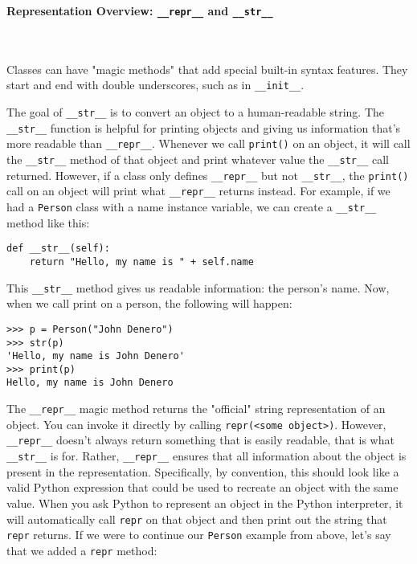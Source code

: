 \textbf{Representation Overview: \lstinline{__repr__} and \lstinline{__str__}}

\\
\\Classes can have "magic methods" that add special built-in syntax features. They start and end with double underscores, such as in \lstinline{__init__}.

The goal of \lstinline{__str__} is to convert an object to a human-readable string. The \lstinline{__str__} function is helpful for printing objects and giving us information that's more readable than \lstinline{__repr__}. Whenever we call \lstinline{print()} on an object, it will call the \lstinline{__str__} method of that object and print whatever value the \lstinline{__str__} call returned. However, if a class only defines \lstinline{__repr__} but not \lstinline{__str__}, the \lstinline{print()} call on an object will print what \lstinline{__repr__} returns instead. For example, if we had a \lstinline{Person} class with a name instance variable, we can create a \lstinline{__str__} method like this:
\begin{lstlisting}
def __str__(self):
    return "Hello, my name is " + self.name
\end{lstlisting}
This \lstinline{__str__} method gives us readable information: the person's name. Now, when we call print on a person, the following will happen:
\begin{lstlisting}
>>> p = Person("John Denero")
>>> str(p)
'Hello, my name is John Denero'
>>> print(p)              
Hello, my name is John Denero
\end{lstlisting}

The \lstinline{__repr__} magic method returns the "official" string representation of an object. You can invoke it directly by calling \lstinline{repr(<some object>)}. However, \lstinline{__repr__} doesn't always return something that is easily readable, that is what \lstinline{__str__} is for. Rather, \lstinline{__repr__} ensures that all information about the object is present in the representation. Specifically, by convention, this should look like a valid Python expression that could be used to recreate an object with the same value. When you ask Python to represent an object in the Python interpreter, it will automatically call \lstinline{repr} on that object and then print out the string that \lstinline{repr} returns. If we were to continue our \lstinline{Person} example from above, let's say that we added a \lstinline{repr} method:

